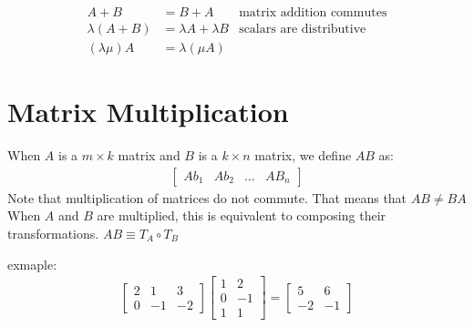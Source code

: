 \documentclass{article}
\theoremstyle{mytheoremstyle}
\theoremstyle{mytheoremstyle}
\theoremstyle{myproblemstyle}
\begin{document}
    \begin{align*}
        A+B             &= B+A & \text{matrix addition commutes}\\
        \lambda (A+B)   &= \lambda A + \lambda B & \text{scalars are distributive}\\
        (\lambda\mu)A   &= \lambda(\mu A)
    \end{align*}

    \section*{Matrix Multiplication}
    When $A$ is a $m\times k$ matrix and $B$ is a $k\times n$ matrix, we define
    $AB$ as:
    \begin{align*}
        \begin{bmatrix}
            Ab_1 & Ab_2 & \dots & AB_n
        \end{bmatrix}
    \end{align*}
    Note that multiplication of matrices do not commute. That means that $AB\ne
    BA$ When $A$ and $B$ are multiplied, this is equivalent to composing their
    transformations. $AB \equiv T_A \circ T_B$

    exmaple:
    \begin{align*}
        \begin{bmatrix}
            2 & 1 & 3 \\
            0 & -1 & -2
        \end{bmatrix} \begin{bmatrix}
            1 & 2 \\
            0 & -1 \\
            1 & 1
        \end{bmatrix} = \begin{bmatrix}
            5 & 6 \\
            -2 & -1
        \end{bmatrix}
    \end{align*}
\end{document}
